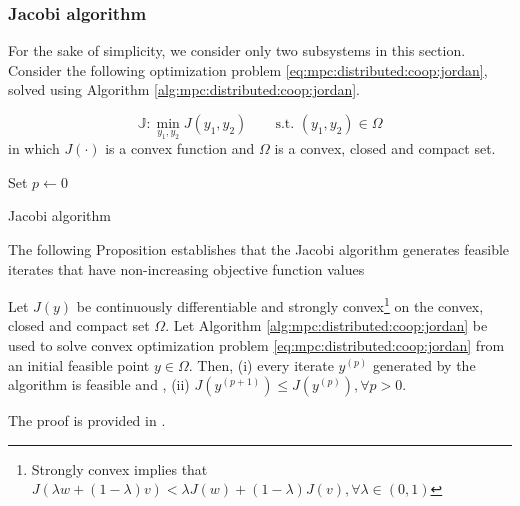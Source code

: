 \subsubsection*{Jacobi algorithm}
For the sake of simplicity, we consider only two subsystems in this
section. Consider the following optimization problem
\eqref{eq:mpc:distributed:coop:jordan}, solved using 
Algorithm \ref{alg:mpc:distributed:coop:jordan}.

\begin{equation}
\label{eq:mpc:distributed:coop:jordan}
\mathbb{J} : \min_{y_1,y_2}{J(y_1,y_2)} \qquad \text{s.t.~} (y_1,y_2)\in \Omega 
\end{equation}
in which $J(\cdot)$ is a convex function and $\Omega$ is a convex,
closed and compact set. 


\begin{algorithm}[H]
 Set $p \leftarrow 0$\\
\label{alg:mpc:distributed:coop:jordan}
\caption{Jacobi algorithm}
\end{algorithm}

The following Proposition establishes that  the Jacobi algorithm
generates feasible iterates that have non-increasing objective
function values
\begin{proposition}
\label{prop:mpc:distributed:jordan}
Let $J(y)$ be continuously differentiable and strongly
convex\footnote{Strongly convex implies that $J(\lambda w +
  (1-\lambda)v)  < \lambda J(w) + (1-\lambda)J(v), \forall \lambda \in
  (0,1)$} on the convex, closed and  compact set $\Omega$.
Let Algorithm \ref{alg:mpc:distributed:coop:jordan} be used to solve
convex optimization problem \eqref{eq:mpc:distributed:coop:jordan}
from an initial feasible point $y \in \Omega$. Then, (i) every iterate
$y^{(p)}$ generated by the algorithm is feasible and , (ii)
$J(y^{(p+1)}) \leq J(y^{(p)}), \forall p>0$.
\end{proposition}
The proof is provided in  \citet{stewart:venkat:rawlings:wright:pannocchia:2010}.

